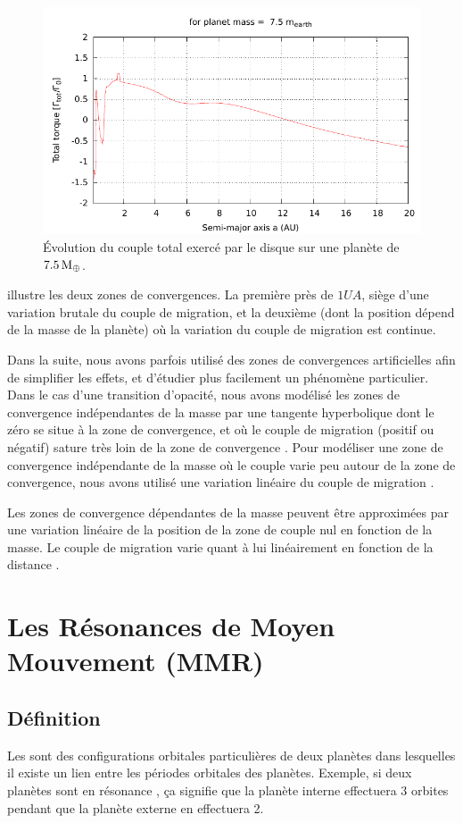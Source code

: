 \begin{figure}[htb]
\centering
\includegraphics[width=0.75\linewidth]{figure/total_torque_fixed_m.pdf}
\caption{Évolution du couple total exercé par le disque sur une planète de $7.5\mathrm{\thinspace M_\oplus}$. }\label{fig:total_torque_fixed_m}
\end{figure}

 illustre les deux zones de convergences. La première près de $1\unit{UA}$, siège d'une variation brutale du couple de migration, et la deuxième (dont la position dépend de la masse de la planète) où la variation du couple de migration est continue. 

Dans la suite, nous avons parfois utilisé des zones de convergences artificielles afin de simplifier les effets, et d'étudier plus facilement un phénomène particulier. Dans le cas d'une transition d'opacité, nous avons modélisé les zones de convergence indépendantes de la masse par une tangente hyperbolique dont le zéro se situe à la zone de convergence, et où le couple de migration (positif ou négatif) sature très loin de la zone de convergence . Pour modéliser une zone de convergence indépendante de la masse où le couple varie peu autour de la zone de convergence, nous avons utilisé une variation linéaire du couple de migration .

Les zones de convergence dépendantes de la masse peuvent être approximées par une variation linéaire de la position de la zone de couple nul en fonction de la masse. Le couple de migration varie quant à lui linéairement en fonction de la distance . 


\section{Les Résonances de Moyen Mouvement (MMR)}
\subsection{Définition}
Les  sont des configurations orbitales particulières de deux planètes
dans lesquelles il existe un lien entre les périodes orbitales des planètes. Exemple, si deux planètes sont en résonance
, ça signifie que la planète interne effectuera 3 orbites pendant que la planète externe en effectuera 2.


